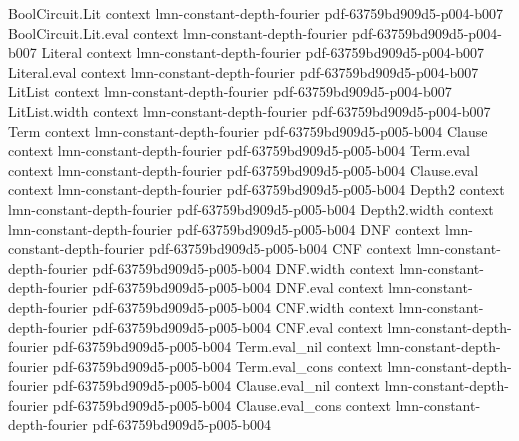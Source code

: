 \begin{lemma}
\label{BoolFourier.parseval_identity_aux_hL2}
\leanok
{}
\proofstep
  {BoolCircuit.Lit}
  {context}
  {lmn-constant-depth-fourier}
  {pdf-63759bd909d5-p004-b007}
\proofstep
  {BoolCircuit.Lit.eval}
  {context}
  {lmn-constant-depth-fourier}
  {pdf-63759bd909d5-p004-b007}
\proofstep
  {Literal}
  {context}
  {lmn-constant-depth-fourier}
  {pdf-63759bd909d5-p004-b007}
\proofstep
  {Literal.eval}
  {context}
  {lmn-constant-depth-fourier}
  {pdf-63759bd909d5-p004-b007}
\proofstep
  {LitList}
  {context}
  {lmn-constant-depth-fourier}
  {pdf-63759bd909d5-p004-b007}
\proofstep
  {LitList.width}
  {context}
  {lmn-constant-depth-fourier}
  {pdf-63759bd909d5-p004-b007}
\proofstep
  {Term}
  {context}
  {lmn-constant-depth-fourier}
  {pdf-63759bd909d5-p005-b004}
\proofstep
  {Clause}
  {context}
  {lmn-constant-depth-fourier}
  {pdf-63759bd909d5-p005-b004}
\proofstep
  {Term.eval}
  {context}
  {lmn-constant-depth-fourier}
  {pdf-63759bd909d5-p005-b004}
\proofstep
  {Clause.eval}
  {context}
  {lmn-constant-depth-fourier}
  {pdf-63759bd909d5-p005-b004}
\proofstep
  {Depth2}
  {context}
  {lmn-constant-depth-fourier}
  {pdf-63759bd909d5-p005-b004}
\proofstep
  {Depth2.width}
  {context}
  {lmn-constant-depth-fourier}
  {pdf-63759bd909d5-p005-b004}
\proofstep
  {DNF}
  {context}
  {lmn-constant-depth-fourier}
  {pdf-63759bd909d5-p005-b004}
\proofstep
  {CNF}
  {context}
  {lmn-constant-depth-fourier}
  {pdf-63759bd909d5-p005-b004}
\proofstep
  {DNF.width}
  {context}
  {lmn-constant-depth-fourier}
  {pdf-63759bd909d5-p005-b004}
\proofstep
  {DNF.eval}
  {context}
  {lmn-constant-depth-fourier}
  {pdf-63759bd909d5-p005-b004}
\proofstep
  {CNF.width}
  {context}
  {lmn-constant-depth-fourier}
  {pdf-63759bd909d5-p005-b004}
\proofstep
  {CNF.eval}
  {context}
  {lmn-constant-depth-fourier}
  {pdf-63759bd909d5-p005-b004}
\proofstep
  {Term.eval_nil}
  {context}
  {lmn-constant-depth-fourier}
  {pdf-63759bd909d5-p005-b004}
\proofstep
  {Term.eval_cons}
  {context}
  {lmn-constant-depth-fourier}
  {pdf-63759bd909d5-p005-b004}
\proofstep
  {Clause.eval_nil}
  {context}
  {lmn-constant-depth-fourier}
  {pdf-63759bd909d5-p005-b004}
\proofstep
  {Clause.eval_cons}
  {context}
  {lmn-constant-depth-fourier}
  {pdf-63759bd909d5-p005-b004}

\end{lemma}
